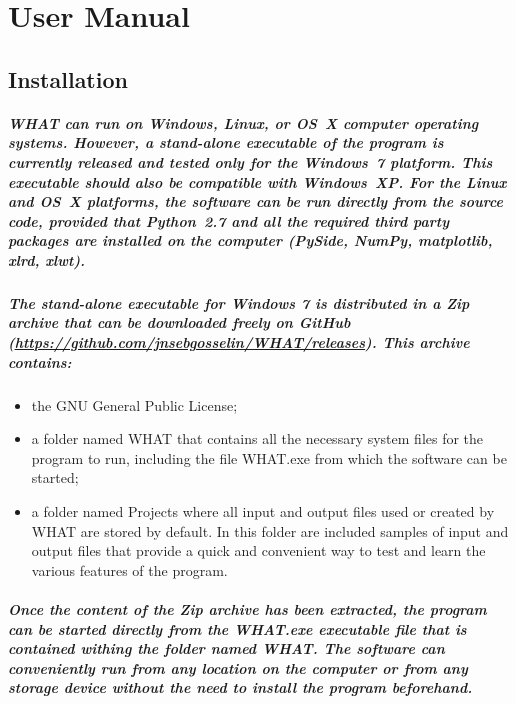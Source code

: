 \documentclass[10pt, letterpaper, fleqn]{report}
\begin{document}
\chapter{User Manual}


\section{Installation}

\paragraph{WHAT can run on Windows, Linux, or OS X computer operating systems. However, a stand-alone executable of the program is currently released and tested only for the Windows 7 platform. This executable should also be compatible with Windows XP. For the Linux and OS X platforms, the software can be run directly from the source code, provided that Python 2.7 and all the required third party packages are installed on the computer (PySide, NumPy, matplotlib, xlrd, xlwt).}
\paragraph{The stand-alone executable for Windows 7 is distributed in a Zip archive that can be downloaded freely on GitHub (\url{https://github.com/jnsebgosselin/WHAT/releases}). This archive contains:}
\begin{itemize}
\item{the GNU General Public License;}
\item{a folder named WHAT that contains all the necessary system files for the program to run, including the file WHAT.exe from which the software can be started;}
\item{a folder named Projects where all input and output files used or created by WHAT are stored by default. In this folder are included samples of input and output files that provide a quick and convenient way to test and learn the various features of the program.}
\end{itemize}
\paragraph{Once the content of the Zip archive has been extracted, the program can be started directly from the WHAT.exe executable file that is contained withing the folder named WHAT. The software can conveniently run from any location on the computer or from any storage device without the need to install the program beforehand.}
\end{document}

